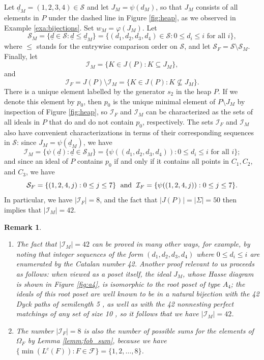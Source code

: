 \documentclass[10pt,a4paper]{amsart}
\newtheorem{rmk}[theorem]{Remark}
\numberwithin{equation}{section}
\newcommand{\lc}{L^c}
\newcommand{\seqd}{\underline{d}}
\newcommand{\calf}{\mathcal{F}}
\newcommand{\cali}{\mathcal{I}}
\newcommand{\cals}{\mathcal{S}}
\newcommand{\fob}{\Omega_F}
\newcommand{\se}{\subseteq}
\newcommand{\abs}[1]{\lvert #1 \rvert}
\begin{document}
Let $\seqd_M=(1,2,3,4)\in \cals$ and let $J_M=\psi(d_M)$, so that $J_M$ consists
of all elements in $P$ under the dashed line in Figure \ref{fig:heap}, as
we observed in Example \ref{exa:bijections}. 
Set $w_M=\varphi(J_M)$.
Let 
\[
  \cals_M=\{\seqd\in \cals: \seqd\le \seqd_M\}=\{(d_1,d_2,d_3,d_4)\in \cals: 0\le d_i\le i
  \text{ for all } i\},
\]
where $\le$ stands for the entrywise comparison order on $\cals$, and let
$\cals_F=\cals\setminus\cals_M$. Finally, let 
 \[ \cali_M= \{K\in J(P): K\se J_M\},\] 
and  
\[
  \cali_F=J(P)\setminus\cali_M=\{K\in J(P): K\not\se J_M\}. 
\] 
There is a unique element labelled by the generator $s_2$ in the heap $P$. If we
denote this element by $p_0$, then $p_0$ is the unique minimal element of
$P\setminus J_M$ by inspection of Figure \ref{fig:heap}, so $\cali_F$ and
$\cali_M$ can be characterized as the sets of all ideals in $P$ that do and do
not contain $p_0$, respectively. The sets $\cali_F$ and $\cali_M$ also have
convenient characterizations in terms of their corresponding sequences in $\cals$:
since $J_M=\psi(\seqd_M)$, we have 
\begin{equation}
\label{eq:cali_M}
\cali_M=\{\psi(\seqd):\seqd\in \cals_M\}=\{\psi((d_1,d_2,d_3,d_4)): 0\le d_i\le i
  \text{ for all } i\};
\end{equation}
and since an ideal of $P$ contains $p_0$ if and only if
it contains all points in $C_1, C_2$, and $C_3$, we have 
\begin{equation}
\label{eq:cali_F}
\cals_F=\{(1,2,4,j):0\le j\le 7\} \text{\; and \;}
  \cali_F=\{\psi((1,2,4,j)): 0\le j\le 7\}.
\end{equation}
In particular, we have $\abs{\cali_F}=8$, and the fact that
$\abs{J(P)}=\abs{\Sigma}=50$ then implies that $\abs{\cali_M}=42$.  

\begin{rmk}
\label{rmk:42}
\begin{enumerate}
\item 
The fact that $\abs{\cali_M}=42$ can be proved in many other ways, for example,
by noting that integer sequences of the form $(d_1,d_2,d_3,d_4)$ where $0\le
d_i\le i$ are enumerated by the Catalan number 42. Another proof relevant to us
proceeds as follows: when viewed as a poset itself, the ideal $J_M$, whose Hasse
diagram is shown in Figure \ref{fig:a4}, is isomorphic to the root poset of type
$A_4$; the ideals of this root poset are well known to be in a natural bijection
with the 42 Dyck paths of semilength 5 \cite[Section 5.1.3]{ringel16}, as well
as with the 42 nonnesting perfect matchings of any set of size 10
\cite[Interpretation 64]{stanley15}, so it follows that we have
$\abs{\cali_M}=42$.  \item The number $\abs{\cali_F}=8$ is also the number of
possible sums for the elements of $\fob$ by Lemma \ref{lemm:fob_sum}, because we
have $\{\min(\lc(F)):F\in \calf\}=\{1,2,\dots, 8\}$. \end{enumerate} \end{rmk}
\end{document}
